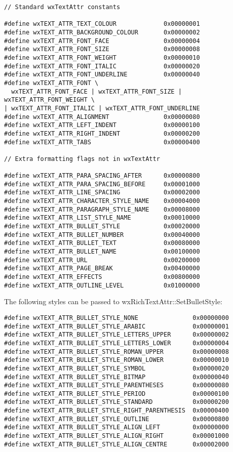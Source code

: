 {\small
\begin{verbatim}
// Standard wxTextAttr constants

#define wxTEXT_ATTR_TEXT_COLOUR             0x00000001
#define wxTEXT_ATTR_BACKGROUND_COLOUR       0x00000002
#define wxTEXT_ATTR_FONT_FACE               0x00000004
#define wxTEXT_ATTR_FONT_SIZE               0x00000008
#define wxTEXT_ATTR_FONT_WEIGHT             0x00000010
#define wxTEXT_ATTR_FONT_ITALIC             0x00000020
#define wxTEXT_ATTR_FONT_UNDERLINE          0x00000040
#define wxTEXT_ATTR_FONT \
  wxTEXT_ATTR_FONT_FACE | wxTEXT_ATTR_FONT_SIZE | wxTEXT_ATTR_FONT_WEIGHT \
| wxTEXT_ATTR_FONT_ITALIC | wxTEXT_ATTR_FONT_UNDERLINE
#define wxTEXT_ATTR_ALIGNMENT               0x00000080
#define wxTEXT_ATTR_LEFT_INDENT             0x00000100
#define wxTEXT_ATTR_RIGHT_INDENT            0x00000200
#define wxTEXT_ATTR_TABS                    0x00000400

// Extra formatting flags not in wxTextAttr

#define wxTEXT_ATTR_PARA_SPACING_AFTER      0x00000800
#define wxTEXT_ATTR_PARA_SPACING_BEFORE     0x00001000
#define wxTEXT_ATTR_LINE_SPACING            0x00002000
#define wxTEXT_ATTR_CHARACTER_STYLE_NAME    0x00004000
#define wxTEXT_ATTR_PARAGRAPH_STYLE_NAME    0x00008000
#define wxTEXT_ATTR_LIST_STYLE_NAME         0x00010000
#define wxTEXT_ATTR_BULLET_STYLE            0x00020000
#define wxTEXT_ATTR_BULLET_NUMBER           0x00040000
#define wxTEXT_ATTR_BULLET_TEXT             0x00080000
#define wxTEXT_ATTR_BULLET_NAME             0x00100000
#define wxTEXT_ATTR_URL                     0x00200000
#define wxTEXT_ATTR_PAGE_BREAK              0x00400000
#define wxTEXT_ATTR_EFFECTS                 0x00800000
#define wxTEXT_ATTR_OUTLINE_LEVEL           0x01000000
\end{verbatim}
}

The following styles can be passed to wxRichTextAttr::SetBulletStyle:

{\small
\begin{verbatim}
#define wxTEXT_ATTR_BULLET_STYLE_NONE               0x00000000
#define wxTEXT_ATTR_BULLET_STYLE_ARABIC             0x00000001
#define wxTEXT_ATTR_BULLET_STYLE_LETTERS_UPPER      0x00000002
#define wxTEXT_ATTR_BULLET_STYLE_LETTERS_LOWER      0x00000004
#define wxTEXT_ATTR_BULLET_STYLE_ROMAN_UPPER        0x00000008
#define wxTEXT_ATTR_BULLET_STYLE_ROMAN_LOWER        0x00000010
#define wxTEXT_ATTR_BULLET_STYLE_SYMBOL             0x00000020
#define wxTEXT_ATTR_BULLET_STYLE_BITMAP             0x00000040
#define wxTEXT_ATTR_BULLET_STYLE_PARENTHESES        0x00000080
#define wxTEXT_ATTR_BULLET_STYLE_PERIOD             0x00000100
#define wxTEXT_ATTR_BULLET_STYLE_STANDARD           0x00000200
#define wxTEXT_ATTR_BULLET_STYLE_RIGHT_PARENTHESIS  0x00000400
#define wxTEXT_ATTR_BULLET_STYLE_OUTLINE            0x00000800
#define wxTEXT_ATTR_BULLET_STYLE_ALIGN_LEFT         0x00000000
#define wxTEXT_ATTR_BULLET_STYLE_ALIGN_RIGHT        0x00001000
#define wxTEXT_ATTR_BULLET_STYLE_ALIGN_CENTRE       0x00002000
\end{verbatim}
}


